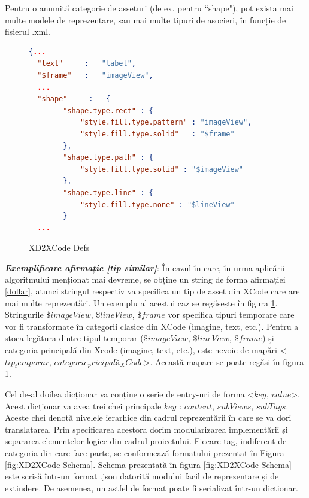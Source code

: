 \begin{myNote}\label{tip similar}

Pentru o anumită categorie de asseturi (de ex. pentru ``shape"), pot exista mai multe modele de reprezentare, sau mai multe tipuri de asocieri, în funcție de fișierul .xml.
\end{myNote}

\begin{figure}[!htbp]
\begin{lstlisting}[language=json,firstnumber=1]
  {...
  "text"     :   "label",
  "$frame"   :   "imageView",
  ...
  "shape"     :   {
        "shape.type.rect" : {
            "style.fill.type.pattern" : "imageView",
            "style.fill.type.solid"   : "$frame"
        },
        "shape.type.path" : {
            "style.fill.type.solid" : "$imageView"
        },
        "shape.type.line" : {
            "style.fill.type.none" : "$lineView"
        }
  ...
\end{lstlisting}
\caption{XD2XCode Defs} \label{fig:XD2XCode Defs}
\end{figure}

\textbf{\textit{Exemplificare afirmație \ref{tip similar}}}: În cazul în care, în urma aplicării algoritmului menționat mai devreme, se obține un string de forma afirmației \ref{dollar}, atunci stringul respectiv va specifica un tip de asset din XCode care are mai multe reprezentări. Un exemplu al acestui caz se regăsește în figura \ref{fig:XD2XCode Defs}. Stringurile $\$imageView$, $\$lineView$, $\$frame$ vor specifica tipuri temporare care vor fi transformate în categorii clasice din XCode (imagine, text, etc.). Pentru a stoca legătura dintre tipul temporar ($\$imageView$, $\$lineView$, $\$frame$) și categoria principală din Xcode (imagine, text, etc.), este nevoie de mapări <$tip_temporar$, $categorie_pricipală_XCode$>. Această mapare se poate regăsi în figura \ref{fig:XD2XCode Defs}.

Cel de-al doilea dicționar va conține o serie de entry-uri de forma <$key$, $value$>. Acest dicționar va avea trei chei principale $key$ : $content$, $subViews$, $subTags$. Aceste chei denotă nivelele ierarhice din cadrul reprezentării în care se va dori translatarea. Prin specificarea acestora dorim modularizarea implementării și separarea elementelor logice din cadrul proiectului. Fiecare tag, indiferent de categoria din care face parte, se conformează formatului prezentat în Figura \ref{fig:XD2XCode Schema}.
Schema prezentată în figura \ref{fig:XD2XCode Schema} este scrisă într-un format .json datorită modului facil de reprezentare și de extindere. De asemenea, un astfel de format poate fi serializat într-un dictionar. 

